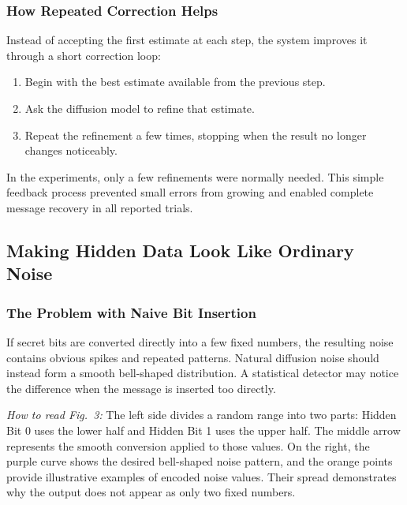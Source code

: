 \documentclass[conference]{IEEEtran}
\begin{document}
\subsubsection{How Repeated Correction Helps}
Instead of accepting the first estimate at each step, the system improves it through a short correction loop:
\begin{enumerate}
    \item Begin with the best estimate available from the previous step.
    \item Ask the diffusion model to refine that estimate.
    \item Repeat the refinement a few times, stopping when the result no longer changes noticeably.
\end{enumerate}
In the experiments, only a few refinements were normally needed. This simple feedback process prevented small errors from growing and enabled complete message recovery in all reported trials.

\subsection{Making Hidden Data Look Like Ordinary Noise}

\subsubsection{The Problem with Naive Bit Insertion}
If secret bits are converted directly into a few fixed numbers, the resulting noise contains obvious spikes and repeated patterns. Natural diffusion noise should instead form a smooth bell-shaped distribution. A statistical detector may notice the difference when the message is inserted too directly.

\textit{How to read Fig.~3:} The left side divides a random range into two parts: Hidden Bit 0 uses the lower half and Hidden Bit 1 uses the upper half. The middle arrow represents the smooth conversion applied to those values. On the right, the purple curve shows the desired bell-shaped noise pattern, and the orange points provide illustrative examples of encoded noise values. Their spread demonstrates why the output does not appear as only two fixed numbers.
\end{document}
